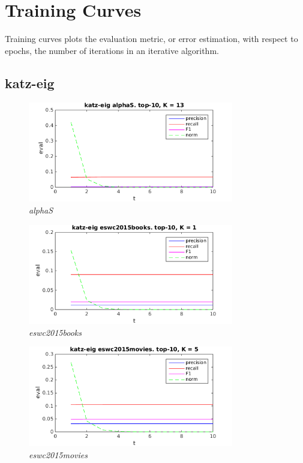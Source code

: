 
\section{Training Curves}\label{sec:graphs:training_curves}

Training curves plots the evaluation metric, or error estimation, with respect to epochs, the number of iterations in an iterative algorithm.

\subsection{katz-eig}

\FloatBarrier

\begin{figure}[h!]
  \centering
    \includegraphics[width=0.8\textwidth]{fig/katzeig_t/alphaS_katzeig_t.png}
    \caption{\textit{alphaS}}
\end{figure}

\begin{figure}[h!]
  \centering
    \includegraphics[width=0.8\textwidth]{fig/katzeig_t/eswc2015books_katzeig_t.png}
    \caption{\textit{eswc2015books}}
\end{figure}

\begin{figure}[h!]
  \centering
    \includegraphics[width=0.8\textwidth]{fig/katzeig_t/eswc2015movies_katzeig_t.png}
    \caption{\textit{eswc2015movies}}
\end{figure}

